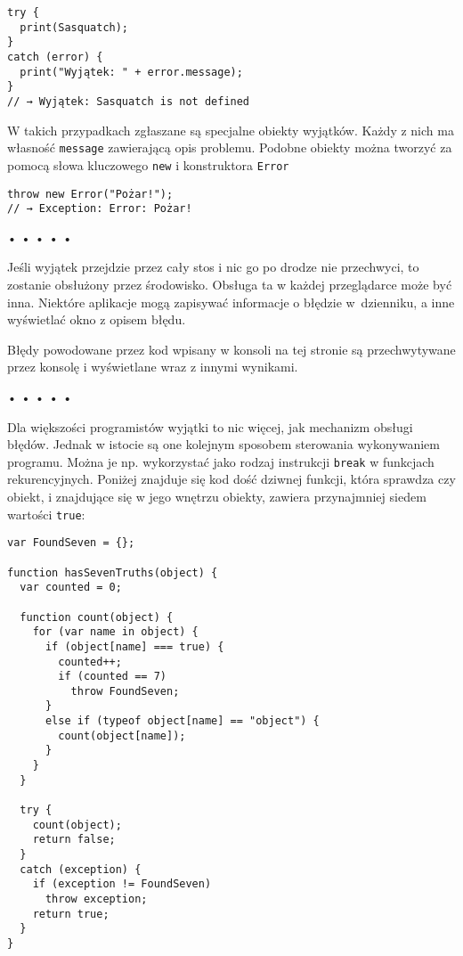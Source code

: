   
\begin{verbatim} 
try {
  print(Sasquatch);
}
catch (error) {
  print("Wyjątek: " + error.message);
}
// → Wyjątek: Sasquatch is not defined
\end{verbatim}
  
W takich przypadkach zgłaszane są specjalne obiekty wyjątków. Każdy z nich ma własność \texttt{message} zawierającą opis problemu. Podobne obiekty można tworzyć za pomocą słowa kluczowego \texttt{new} i konstruktora \texttt{Error}

  
\begin{verbatim} 
throw new Error("Pożar!");
// → Exception: Error: Pożar!
\end{verbatim}


\begin{center}
• • • • •
\end{center}

  
Jeśli wyjątek przejdzie przez cały stos i nic go po drodze nie przechwyci, to zostanie obsłużony przez środowisko. Obsługa ta w każdej przeglądarce może być inna. Niektóre aplikacje mogą zapisywać informacje o błędzie w~dzienniku, a inne wyświetlać okno z opisem błędu.

  
Błędy powodowane przez kod wpisany w konsoli na tej stronie są przechwytywane przez konsolę i wyświetlane wraz z innymi wynikami.



\begin{center}
• • • • •
\end{center}

  
Dla większości programistów wyjątki to nic więcej, jak mechanizm obsługi błędów. Jednak w istocie są one kolejnym sposobem sterowania wykonywaniem programu. Można je np. wykorzystać jako rodzaj instrukcji \texttt{break} w funkcjach rekurencyjnych. Poniżej znajduje się kod dość dziwnej funkcji, która sprawdza czy obiekt, i znajdujące się w jego wnętrzu obiekty, zawiera przynajmniej siedem wartości \texttt{true}:

  
\begin{verbatim} 
var FoundSeven = {};

function hasSevenTruths(object) {
  var counted = 0;

  function count(object) {
    for (var name in object) {
      if (object[name] === true) {
        counted++;
        if (counted == 7)
          throw FoundSeven;
      }
      else if (typeof object[name] == "object") {
        count(object[name]);
      }
    }
  }

  try {
    count(object);
    return false;
  }
  catch (exception) {
    if (exception != FoundSeven)
      throw exception;
    return true;
  }
}
 \end{verbatim}
  
